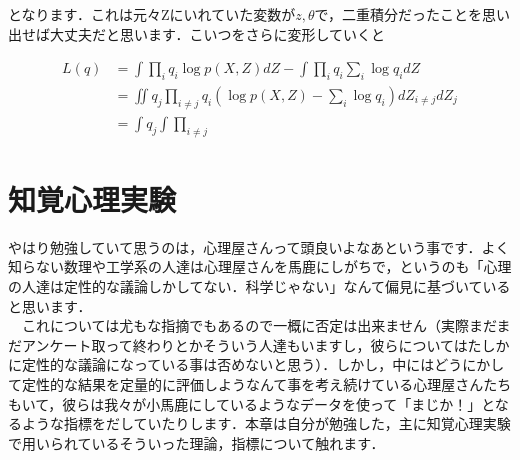\documentclass[11pt,a4paper]{ujreport}
\begin{document}
となります．これは元々Zにいれていた変数が$z,\theta$で，二重積分だったことを思い出せば大丈夫だと思います．こいつをさらに変形していくと

\begin{align}
  L(q) &= \int \prod_i q_i \log p(X,Z)dZ - \int \prod_i q_i\sum_i \log q_i dZ\\
  &=\iint q_j\prod_{i\neq j} q_i (\log p(X,Z) - \sum_i \log q_i) dZ_{i \neq j}dZ_j\\
  &=\int q_j \int \prod_{i\neq j}
\end{align}








































\chapter{知覚心理実験}
やはり勉強していて思うのは，心理屋さんって頭良いよなあという事です．よく知らない数理や工学系の人達は心理屋さんを馬鹿にしがちで，というのも「心理の人達は定性的な議論しかしてない．科学じゃない」なんて偏見に基づいていると思います．\\
　これについては尤もな指摘でもあるので一概に否定は出来ません（実際まだまだアンケート取って終わりとかそういう人達もいますし，彼らについてはたしかに定性的な議論になっている事は否めないと思う）．しかし，中にはどうにかして定性的な結果を定量的に評価しようなんて事を考え続けている心理屋さんたちもいて，彼らは我々が小馬鹿にしているようなデータを使って「まじか！」となるような指標をだしていたりします．本章は自分が勉強した，主に知覚心理実験で用いられているそういった理論，指標について触れます．
\end{document}
